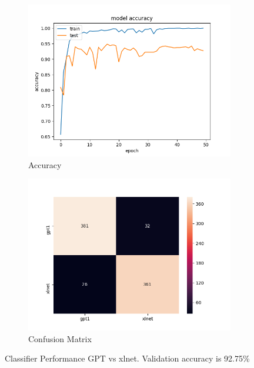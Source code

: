 \documentclass[11pt,letterpaper]{article}
\begin{document}
\begin{figure}[h!]
        \centering
        \begin{subfigure}[b]{1.0\linewidth}
                \centering
                \includegraphics[width=0.7\linewidth]{accuracy_epochs_gpt1_xlnet.png}
                \caption{Accuracy}
        \end{subfigure}
        \begin{subfigure}[b]{1.0\linewidth}
                \centering
                \includegraphics[width=0.7\linewidth]{sns_heatmap_gpt1_xlnet.png}
                \caption{Confusion Matrix}
        \end{subfigure}
        \caption{Classifier Performance GPT vs xlnet. Validation accuracy is 92.75\%}
        \label{fig:prob6.2}
\end{figure}
\end{document}
